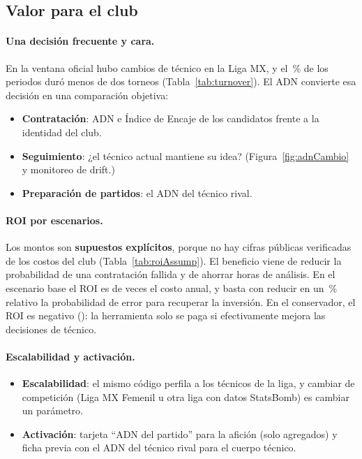 \documentclass[11pt,a4paper]{article}
\begin{document}
\subsection{Valor para el club}
\paragraph{Una decisión frecuente y cara.} En la ventana oficial hubo \cambiosTecnico{} cambios de técnico en la Liga
MX, y el \pctCortos\,\% de los periodos duró menos de dos torneos (Tabla~\ref{tab:turnover}). El ADN convierte esa
decisión en una comparación objetiva:
\begin{itemize}
  \item \textbf{Contratación}: ADN e Índice de Encaje de los candidatos frente a la identidad del club.
  \item \textbf{Seguimiento}: ¿el técnico actual mantiene su idea? (Figura~\ref{fig:adnCambio} y monitoreo de drift.)
  \item \textbf{Preparación de partidos}: el ADN del técnico rival.
\end{itemize}



\paragraph{ROI por escenarios.} Los montos son \textbf{supuestos explícitos}, porque no hay cifras públicas verificadas
de los costos del club (Tabla~\ref{tab:roiAssump}). El beneficio viene de reducir la probabilidad de una contratación
fallida y de ahorrar horas de análisis. En el escenario base el ROI es de \roiBase{} veces el costo anual, y basta con
reducir en un \equilibrioBase\,\% relativo la probabilidad de error para recuperar la inversión. En el conservador, el
ROI es negativo (\roiCons): la herramienta solo se paga si efectivamente mejora las decisiones de técnico.




\paragraph{Escalabilidad y activación.}
\begin{itemize}
  \item \textbf{Escalabilidad}: el mismo código perfila a los \nTecnicos{} técnicos de la liga, y cambiar de competición
        (Liga MX Femenil u otra liga con datos StatsBomb) es cambiar un parámetro.
  \item \textbf{Activación}: tarjeta ``ADN del partido'' para la afición (solo agregados) y ficha previa con el ADN del
        técnico rival para el cuerpo técnico.
\end{itemize}
\end{document}
